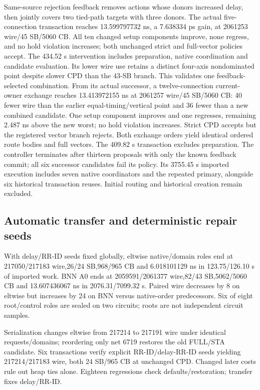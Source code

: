 \documentclass[conference,10pt]{IEEEtran}
\begin{document}
Same-source rejection feedback removes actions whose donors increased delay, then jointly covers two tied-path targets with three donors. The actual five-connection transaction reaches 13.599797732 ns, a 7.638334 ps gain, at 2061253 wire/45 SB/5060 CB. All ten changed setup components improve, none regress, and no hold violation increases; both unchanged strict and full-vector policies accept. The 434.52 s intervention includes preparation, native coordination and candidate evaluation. Its lower wire use retains a distinct four-axis nondominated point despite slower CPD than the 43-SB branch. This validates one feedback-selected combination. From its actual successor, a twelve-connection current-owner exchange reaches 13.413972155 ns at 2061257 wire/45 SB/5060 CB: 40 fewer wire than the earlier equal-timing/vertical point and 36 fewer than a new combined candidate. One setup component improves and one regresses, remaining 2.487 ns above the new worst; no hold violation increases. Strict CPD accepts but the registered vector branch rejects. Both exchange orders yield identical ordered route bodies and full vectors. The 409.82 s transaction excludes preparation. The controller terminates after thirteen proposals with only the known feedback commit; all six successor candidates fail its policy. Its 3755.45 s imported execution includes seven native coordinators and the repeated primary, alongside six historical transaction reuses. Initial routing and historical creation remain excluded.

\subsection{Automatic transfer and deterministic repair seeds}
With delay/RR-ID seeds fixed globally, eltwise native/domain roles end at 217050/217183 wire,26/24 SB,968/965 CB and 6.018101129 ns in 123.75/126.10 s of imported work. BNN A0 ends at 2059591/2061377 wire,82/43 SB,5062/5060 CB and 13.607436067 ns in 2076.31/7099.32 s. Paired wire decreases by 8 on eltwise but increases by 24 on BNN versus native-order predecessors. Six of eight root/control roles are sealed on two circuits; roots are not independent circuit samples.

Serialization changes eltwise from 217214 to 217191 wire under identical requests/domains; reordering only net 6719 restores the old FULL/STA candidate. Six transactions verify explicit RR-ID/delay-RR-ID seeds yielding 217214/217183 wire, both 24 SB/965 CB at unchanged CPD. Changed later costs rule out heap ties alone. Eighteen regressions check defaults/restoration; transfer fixes delay/RR-ID.
\end{document}
